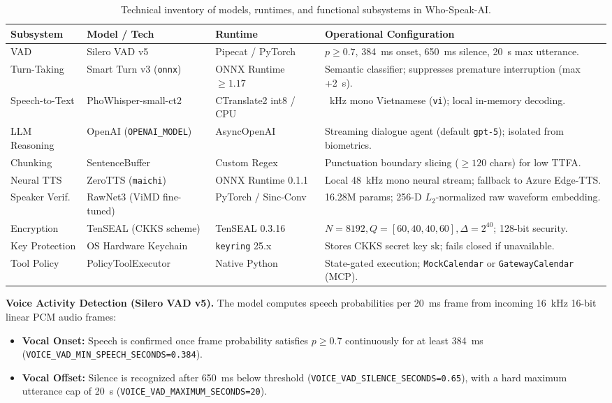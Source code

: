 \begin{table}[htbp]
\centering
\scriptsize
\renewcommand{\arraystretch}{1.05}
\begin{tabularx}{\textwidth}{l >{\raggedright\arraybackslash}p{3.2cm} >{\raggedright\arraybackslash}p{2.5cm} >{\raggedright\arraybackslash}X}
\toprule
\textbf{Subsystem} & \textbf{Model / Tech} & \textbf{Runtime} & \textbf{Operational Configuration} \\
\midrule
VAD & Silero VAD v5 & Pipecat / PyTorch & $p \ge 0.7$, 384~ms onset, 650~ms silence, 20~s max utterance. \\
Turn-Taking & Smart Turn v3 (\texttt{onnx}) & ONNX Runtime $\ge 1.17$ & Semantic classifier; suppresses premature interruption (max +2~s). \\
Speech-to-Text & PhoWhisper-small-ct2 & CTranslate2 int8 / CPU & 16~kHz mono Vietnamese (\texttt{vi}); local in-memory decoding. \\
LLM Reasoning & OpenAI (\texttt{OPENAI\_MODEL}) & AsyncOpenAI & Streaming dialogue agent (default \texttt{gpt-5}); isolated from biometrics. \\
Chunking & SentenceBuffer & Custom Regex & Punctuation boundary slicing ($\ge 120$ chars) for low TTFA. \\
Neural TTS & ZeroTTS (\texttt{maichi}) & ONNX Runtime 0.1.1 & Local 48~kHz mono neural stream; fallback to Azure Edge-TTS. \\
Speaker Verif. & RawNet3 (ViMD fine-tuned) & PyTorch / Sinc-Conv & 16.28M params; 256-D $L_2$-normalized raw waveform embedding. \\
Encryption & TenSEAL (CKKS scheme) & TenSEAL 0.3.16 & $N=8192, Q=[60,40,40,60], \Delta=2^{40}$; 128-bit security. \\
Key Protection & OS Hardware Keychain & \texttt{keyring} 25.x & Stores CKKS secret key $\text{sk}$; fails closed if unavailable. \\
Tool Policy & PolicyToolExecutor & Native Python & State-gated execution; \texttt{MockCalendar} or \texttt{GatewayCalendar} (MCP). \\
\bottomrule
\end{tabularx}
\caption{Technical inventory of models, runtimes, and functional subsystems in Who-Speak-AI.}
\label{tab:architecture-stack}
\end{table}

\textbf{Voice Activity Detection (Silero VAD v5).} The model computes speech probabilities per 20~ms frame from incoming 16~kHz 16-bit linear PCM audio frames:
\begin{itemize}
    \item \textbf{Vocal Onset:} Speech is confirmed once frame probability satisfies $p \ge 0.7$ continuously for at least 384~ms (\texttt{VOICE\_VAD\_MIN\_SPEECH\_SECONDS=0.384}).
    \item \textbf{Vocal Offset:} Silence is recognized after 650~ms below threshold (\texttt{VOICE\_VAD\_SILENCE\_SECONDS=0.65}), with a hard maximum utterance cap of 20~s (\texttt{VOICE\_VAD\_MAXIMUM\_SECONDS=20}).
\end{itemize}

